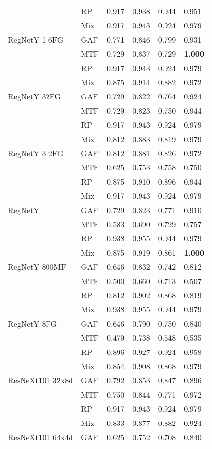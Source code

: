 \begin{longtable}[t]{llllll}
 & RP & 0.917 & 0.938 & 0.944 & 0.951 \\
 & Mix & 0.917 & 0.943 & 0.924 & 0.979 \\
RegNetY 1 6FG & GAF & 0.771 & 0.846 & 0.799 & 0.931 \\
 & MTF & 0.729 & 0.837 & 0.729 & \textbf{1.000} \\
 & RP & 0.917 & 0.943 & 0.924 & 0.979 \\
 & Mix & 0.875 & 0.914 & 0.882 & 0.972 \\
RegNetY 32FG & GAF & 0.729 & 0.822 & 0.764 & 0.924 \\
 & MTF & 0.729 & 0.823 & 0.750 & 0.944 \\
 & RP & 0.917 & 0.943 & 0.924 & 0.979 \\
 & Mix & 0.812 & 0.883 & 0.819 & 0.979 \\
RegNetY 3 2FG & GAF & 0.812 & 0.881 & 0.826 & 0.972 \\
 & MTF & 0.625 & 0.753 & 0.758 & 0.750 \\
 & RP & 0.875 & 0.910 & 0.896 & 0.944 \\
 & Mix & 0.917 & 0.943 & 0.924 & 0.979 \\
RegNetY & GAF & 0.729 & 0.823 & 0.771 & 0.910 \\
 & MTF & 0.583 & 0.690 & 0.729 & 0.757 \\
 & RP & 0.938 & 0.955 & 0.944 & 0.979 \\
 & Mix & 0.875 & 0.919 & 0.861 & \textbf{1.000} \\
RegNetY 800MF & GAF & 0.646 & 0.832 & 0.742 & 0.812 \\
 & MTF & 0.500 & 0.660 & 0.713 & 0.507 \\
 & RP & 0.812 & 0.902 & 0.868 & 0.819 \\
 & Mix & 0.938 & 0.955 & 0.944 & 0.979 \\
RegNetY 8FG & GAF & 0.646 & 0.790 & 0.750 & 0.840 \\
 & MTF & 0.479 & 0.738 & 0.648 & 0.535 \\
 & RP & 0.896 & 0.927 & 0.924 & 0.958 \\
 & Mix & 0.854 & 0.908 & 0.868 & 0.979 \\
ResNeXt101 32x8d & GAF & 0.792 & 0.853 & 0.847 & 0.896 \\
 & MTF & 0.750 & 0.844 & 0.771 & 0.972 \\
 & RP & 0.917 & 0.943 & 0.924 & 0.979 \\
 & Mix & 0.833 & 0.877 & 0.882 & 0.924 \\
ResNeXt101 64x4d & GAF & 0.625 & 0.752 & 0.708 & 0.840 \\

\end{longtable}
